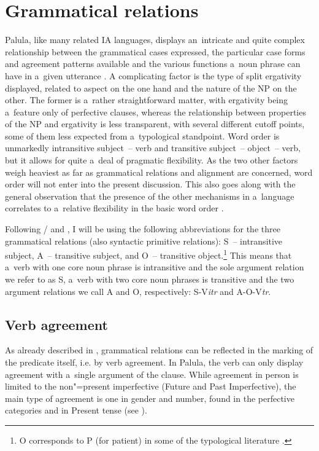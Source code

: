 \chapter{Grammatical relations}
\label{chap:11}

Palula, like many related IA languages, displays an~intricate and quite complex relationship between the grammatical cases expressed, the particular case forms and agreement patterns available and the various functions a~noun phrase can have in a~given utterance \citep[230--231]{masica1991}. A complicating factor is the type of split ergativity displayed, related to aspect on the one hand and the nature of the NP on the other. The former is a~rather straightforward matter, with ergativity being a~feature only of perfective clauses, whereas the relationship between properties of the NP and ergativity is less transparent, with several different cutoff points, some of them less expected from a~typological standpoint. Word order is unmarkedly intransitive subject~-- verb and transitive subject~-- object~-- verb, but it allows for quite a~deal of pragmatic flexibility. As the two other factors weigh heaviest as far as grammatical relations and alignment are concerned, word order will not enter into the present discussion. This also goes along with the general observation that the presence of the other mechanisms in a~language correlates to a~relative flexibility in the basic word order \citep[14--15]{blake2001}.



Following \citet[6--8]{dixon1994}/\citet[76--77]{dixon2010} and \citet[402]{bickel2011}, I will be using the following abbreviations for the three grammatical relations (also syntactic primitive relations): S~-- intransitive subject, A~-- transitive subject, and O~-- transitive object.\footnote{O corresponds to P (for patient) in some of the typological literature \citep{comrie1989,croft2003}.\par } This means that a~verb with one core noun phrase is intransitive and the sole argument relation we refer to as S, a~verb with two core noun phrases is transitive and the two argument relations we call A and O, respectively: S-V\textit{itr} and A-O-V\textit{tr}.


\section{Verb agreement}
\label{sec:11-1}

As already described in , grammatical relations can be reflected in the marking of the predicate itself, i.e. by verb agreement. In Palula, the verb can only display agreement with a~single argument of the clause. While agreement in person is limited to the non"=present imperfective (Future and Past Imperfective), the main type of agreement is one in gender and number, found in the perfective categories and in Present tense (see ). 


